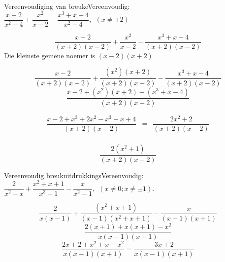 %      
\begin{wex}{Vereenvoudiging van breuke}{Vereenvoudig: $\dfrac{x-2}{{x}^{2}-4}+\dfrac{{x}^{2}}{x-2}-\dfrac{{x}^{3}+x-4}{{x}^{2}-4}, ~~(x \neq \pm2)$}
{
\begin{equation*}
\frac{x-2}{(x+2)(x-2)}+\frac{{x}^{2}}{x-2}-\frac{{x}^{3}+x-4}{(x+2)(x-2)}
\end{equation*}
 Die kleinste gemene noemer is $(x-2)(x+2)$\par 

\begin{equation*}
\frac{x-2}{(x+2)(x-2)}+\frac{({x}^{2})
(x+2)}{(x+2)(x-2)}-\frac{{x}^{3}+x-4}{(x+2)(x-2)}
\end{equation*}
\begin{equation*}
\frac{x-2+({x}^{2})(x+2)-(x^{3}+x-4)}{(x+2)(x-2)}
\end{equation*}

\begin{equation*}
 \begin{array}{llll}
\dfrac{x-2+{x}^{3}+ 2x^{2}-x^{3} - x+4}{(x+2)(x-2)} & = & \dfrac{2x^{2} + 2}{(x+2)(x-2)}\\
\end{array}
\end{equation*}

\begin{equation*}
\dfrac{2({x}^{2}
+1)}{(x+2)(x-2)}
\end{equation*}
}
\end{wex}

\begin{wex}{Vereenvoudig breukuitdrukkings}{Vereenvoudig: $\dfrac{2}{{x}^{2}-x}+\dfrac{x^{2}+x+1}{x^{3}-1}-\dfrac{x}{{x}^{2}-1}, ~~(x \neq 0;x \neq \pm1)$.}
{
\begin{equation*}
\dfrac{2}{x(x-1)}+ \dfrac{({x}^{2} + x + 1)}{(x-1)(x^{2}+x+1)}-\dfrac{x}{(x-1)(x+1)}
\end{equation*}
\begin{equation*}
\dfrac{2(x+1)+x(x+1)-x^{2}}{x(x-1)(x+1)}
\end{equation*}
\begin{equation*}
\dfrac{2x+2 + x^{2} + x - x^{2}}{x(x-1)(x+1)} = \dfrac{3x+2}{x(x-1)(x+1)}
\end{equation*}



}
\end{wex}


